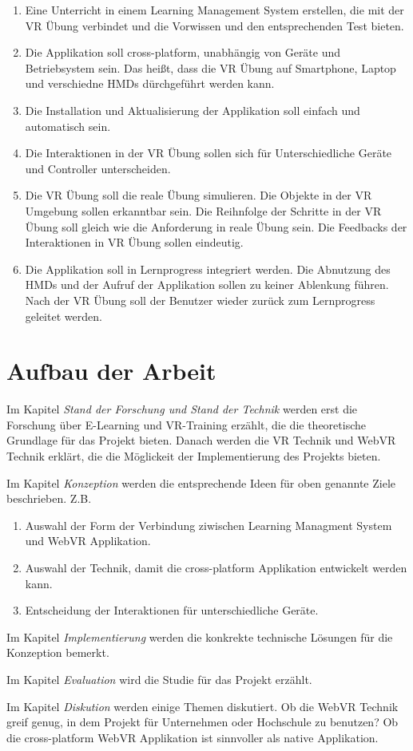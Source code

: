 \begin{enumerate}[labelsep=1ex]
	\renewcommand{\labelenumi}{\textbf{Z\theenumi.}}
	\item Eine Unterricht in einem Learning Management System erstellen, die mit der VR Übung verbindet  und die Vorwissen und den entsprechenden Test bieten.
	\item Die Applikation soll cross-platform, unabhängig von Geräte und Betriebsystem sein. Das heißt, dass die VR Übung auf Smartphone, Laptop und verschiedne HMDs dürchgeführt werden kann.
	\item Die Installation und Aktualisierung der Applikation soll einfach und automatisch sein.
	\item Die Interaktionen in der VR Übung sollen sich für Unterschiedliche Geräte und Controller unterscheiden.
	\item Die VR Übung soll die reale Übung simulieren. Die Objekte in der VR Umgebung sollen erkanntbar sein. Die Reihnfolge der Schritte in der VR Übung soll gleich wie die Anforderung in reale Übung sein. Die Feedbacks der Interaktionen in VR Übung sollen eindeutig.
	\item Die Applikation soll in Lernprogress integriert werden. Die Abnutzung des HMDs und der Aufruf der Applikation sollen zu keiner Ablenkung führen. Nach der VR Übung soll der Benutzer wieder zurück zum Lernprogress geleitet werden.
	
\end{enumerate}

\section{Aufbau der Arbeit}
Im Kapitel {\em Stand der Forschung und Stand der Technik} werden erst die Forschung über E-Learning und VR-Training erzählt, die die theoretische Grundlage für das Projekt bieten. Danach werden die VR Technik und WebVR Technik erklärt, die die Möglickeit der Implementierung des Projekts bieten.

Im Kapitel {\em Konzeption} werden die entsprechende Ideen für oben genannte Ziele beschrieben. Z.B.
\begin{enumerate}
\item Auswahl der Form der Verbindung ziwischen Learning Managment System und WebVR Applikation.
\item Auswahl der Technik, damit die cross-platform Applikation entwickelt werden kann.
\item Entscheidung der Interaktionen für unterschiedliche Geräte.
\end{enumerate}

Im Kapitel {\em Implementierung} werden die konkrekte technische Lösungen für die Konzeption bemerkt.

Im Kapitel {\em Evaluation} wird die Studie für das Projekt erzählt.

Im Kapitel {\em Diskution} werden einige Themen diskutiert. Ob die WebVR Technik greif genug, in dem Projekt für Unternehmen oder Hochschule zu benutzen? Ob die cross-platform WebVR Applikation ist sinnvoller als native Applikation.